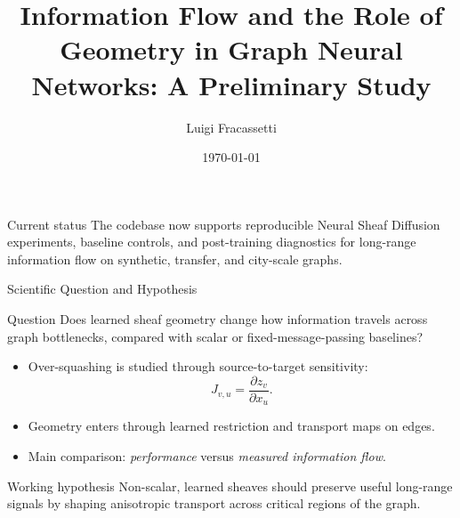 \documentclass[11pt]{beamer}
\title[]{Information Flow and the Role of Geometry in Graph Neural Networks: A Preliminary Study}
\author{Luigi Fracassetti}
\date{\today}
\begin{document}
\begin{frame}
  \titlepage
  \vspace{-0.5cm}
  \begin{block}{Current status}
    The codebase now supports reproducible Neural Sheaf Diffusion experiments,
    baseline controls, and post-training diagnostics for long-range information
    flow on synthetic, transfer, and city-scale graphs.
  \end{block}
\end{frame}

\begin{frame}{Scientific Question and Hypothesis}
  \begin{block}{Question}
    Does learned sheaf geometry change how information travels across graph
    bottlenecks, compared with scalar or fixed-message-passing baselines?
  \end{block}

  \begin{itemize}
    \item Over-squashing is studied through source-to-target sensitivity:
    \[
      J_{v,u}=\frac{\partial z_v}{\partial x_u}.
    \]
    \item Geometry enters through learned restriction and transport maps on edges.
    \item Main comparison: \emph{performance} versus \emph{measured information flow}.
  \end{itemize}

  \begin{block}{Working hypothesis}
    Non-scalar, learned sheaves should preserve useful long-range signals by
    shaping anisotropic transport across critical regions of the graph.
  \end{block}
\end{frame}
\end{document}
